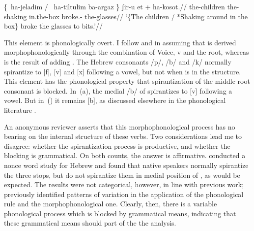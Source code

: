 	\a \label{ex:piel2}\begingl
	\gla \{\cmark~ha-jeladim / \xmark~ha-tiltulim ba-argaz \} ʃir-u et + \phantom{\{\cmark~}ha-kosot.//
	\glb \phantom{\{\cmark~}the-children {} \phantom{\xmark~}the-shaking in.the-box {} broke.-  \phantom{\{\cmark~}the-glasses//
	\glft `\{The children / *Shaking around in the box\} broke the glasses to bits.'//
	\endgl
\xe

This element is phonologically overt. I follow \cite{doron03} and \cite{kastner16nllt} in assuming that {\tkal} is derived morphophonologically through the combination of Voice, v and the root, whereas {\tpie} is the result of adding {\va}. The Hebrew consonants /p/, /b/ and /k/ normally spirantize to [f], [v] and [x] following a vowel, but not when {\va} is in the structure. This element has the phonological property that spirantization of the middle root consonant is blocked. In~(\lastx a), the medial /b/ of  spirantizes to [v] following a vowel. But in~(\lastx) it remains [b], as discussed elsewhere in the phonological literature \citep{temkinmartinez08wccfl,gouskova12nllt,kastner16nllt}. 

An anonymous reviewer asserts that this morphophonological process has no bearing on the internal structure of these verbs. Two considerations lead me to disagree: whether the spirantization process is productive, and whether the blocking is grammatical. On both counts, the answer is affirmative. \cite{temkinmartinzemuellner16} conducted a nonce word study for Hebrew and found that native speakers normally spirantize the three stops, but do not spirantize them in medial position of {\tpie}, as would be expected. The results were not categorical, however, in line with previous work; \cite{adam02} previously identified patterns of variation in the application of the phonological rule and the morphophonological one. Clearly, then, there is a variable phonological process which is blocked by grammatical means, indicating that these grammatical means should part of the the analysis.

